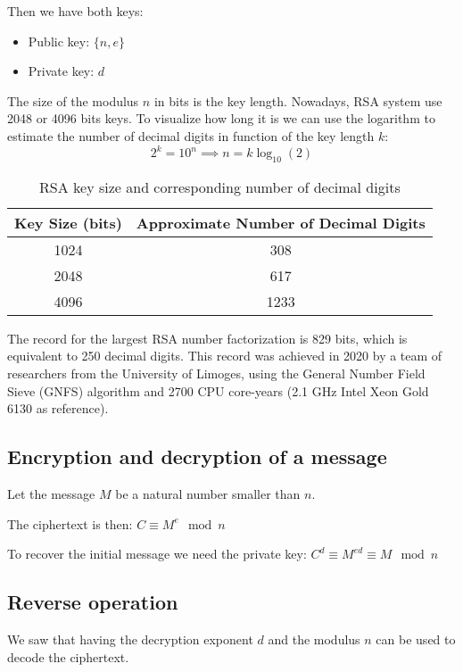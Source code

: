 \documentclass[a4paper, 11pt]{article}
\begin{document}
Then we have both keys:
\begin{itemize}
    \item Public key: $\{n,e\}$
    \item Private key: $d$
\end{itemize}

The size of the modulus $n$ in bits is the key length. Nowadays, RSA system use 2048 or 4096 bits keys. To visualize how long it is we can use the logarithm to estimate the number of decimal digits in function of the key length $k$:
\begin{equation}
    2^k = 10^n \implies n = k \log_{10}(2)
\end{equation}

\begin{table}[h!]
\centering
    \begin{tabular}{|c|c|}
        \hline
        \textbf{Key Size (bits)} & \textbf{Approximate Number of Decimal Digits} \\
        \hline
        1024 & 308 \\
        2048 & 617 \\
        4096 & 1233 \\
        \hline
    \end{tabular}
\caption{RSA key size and corresponding number of decimal digits}
\end{table}

The record for the largest RSA number factorization is 829 bits, which is equivalent to 250 decimal digits. This record was achieved in 2020 by a team of researchers from the University of Limoges, using the General Number Field Sieve (GNFS) algorithm and 2700 CPU core-years (2.1 GHz Intel Xeon Gold 6130 as reference). 

\subsection{Encryption and decryption of a message}
Let the message $M$ be a natural number smaller than $n$.

The ciphertext is then: $C \equiv M^e \mod n$

To recover the initial message we need the private key: $C^d \equiv M^{ed} \equiv M \mod n$

\subsection{Reverse operation}
We saw that having the decryption exponent $d$ and the modulus $n$ can be used to decode the ciphertext. 
\end{document}
